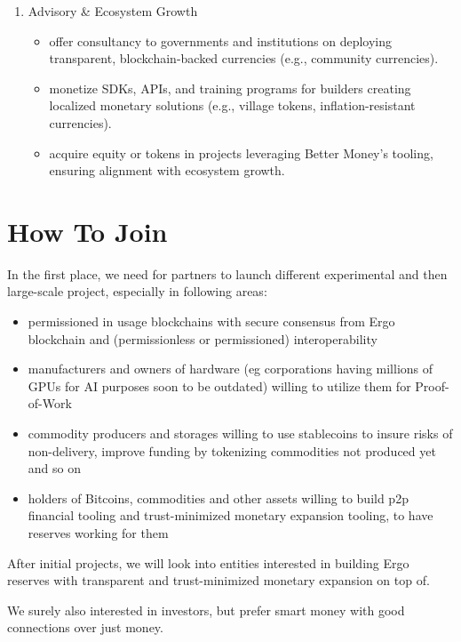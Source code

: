 \documentclass{llncs}   %
\begin{document}
\begin{enumerate}
\item Advisory \& Ecosystem Growth
\begin{itemize}
  \item offer consultancy to governments and institutions on deploying transparent, blockchain-backed currencies (e.g., community currencies).
  \item monetize SDKs, APIs, and training programs for builders creating localized monetary solutions (e.g., village tokens, inflation-resistant currencies).
  \item acquire equity or tokens in projects leveraging Better Money’s tooling, ensuring alignment with ecosystem growth.
\end{itemize}

\end{enumerate}

\section{How To Join}
\label{sec-join}

In the first place, we need for partners to launch different experimental and then large-scale project, especially in
following areas:

\begin{itemize}
  \item permissioned in usage blockchains with secure consensus from Ergo blockchain and (permissionless or permissioned) interoperability
  \item manufacturers and owners of hardware (eg corporations having millions of GPUs for AI purposes soon to be outdated) willing to utilize them for
        Proof-of-Work
  \item commodity producers and storages willing to use stablecoins to insure risks of non-delivery, improve funding by tokenizing
        commodities not produced yet and so on
  \item holders of Bitcoins, commodities and other assets willing to build p2p financial tooling and trust-minimized monetary expansion tooling, to have
        reserves working for them
\end{itemize}

After initial projects, we will look into entities interested in building Ergo reserves with transparent and trust-minimized
monetary expansion on top of.

We surely also interested in investors, but prefer smart money with good connections over just money.


\newpage

 
\end{document}
